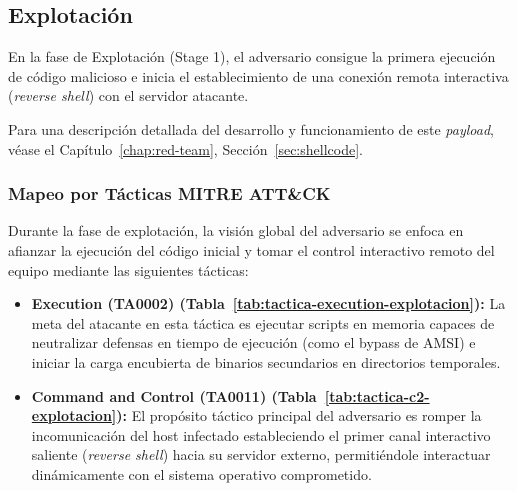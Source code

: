 \newpage
\subsection{Explotación} \label{sec:explotacion}

En la fase de Explotación (Stage 1), el adversario consigue la primera ejecución de código malicioso e inicia el establecimiento de una conexión remota interactiva (\textit{reverse shell}) con el servidor atacante.

Para una descripción detallada del desarrollo y funcionamiento de este \textit{payload}, véase el Capítulo~\ref{chap:red-team}, Sección~\ref{sec:shellcode}.

\subsubsection{Mapeo por Tácticas MITRE ATT\&CK}

Durante la fase de explotación, la visión global del adversario se enfoca en afianzar la ejecución del código inicial y tomar el control interactivo remoto del equipo mediante las siguientes tácticas:

\begin{itemize}
    \item \textbf{Execution (TA0002) (Tabla~\ref{tab:tactica-execution-explotacion}):} La meta del atacante en esta táctica es ejecutar scripts en memoria capaces de neutralizar defensas en tiempo de ejecución (como el bypass de AMSI) e iniciar la carga encubierta de binarios secundarios en directorios temporales.
    
    \item \textbf{Command and Control (TA0011) (Tabla~\ref{tab:tactica-c2-explotacion}):} El propósito táctico principal del adversario es romper la incomunicación del host infectado estableciendo el primer canal interactivo saliente (\textit{reverse shell}) hacia su servidor externo, permitiéndole interactuar dinámicamente con el sistema operativo comprometido.
\end{itemize}

